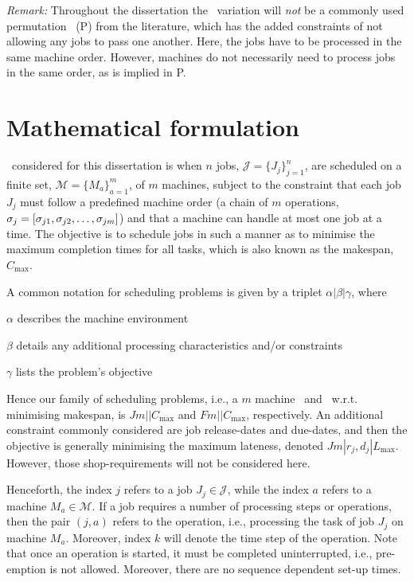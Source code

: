 \emph{Remark:} Throughout the dissertation the \FSP\ variation will \emph{not} 
be a commonly used permutation \fsp\ (P\FSP) from the literature, which has 
the added constraints of not allowing any jobs to pass one another.
Here, the jobs have to be processed in the same machine order. However, 
machines do not necessarily need to process jobs in the same order, as is 
implied in P\FSP.

\section{Mathematical formulation}
\Jsp\ considered for this dissertation is when $n$ jobs, 
$\mathcal{J}=\{J_j\}_{j=1}^n$, are scheduled on a finite set, 
$\mathcal{M}=\{M_a\}_{a=1}^m$, of $m$ machines, subject to the constraint that 
each job $J_j$ must follow a predefined machine order (a chain of 
$m$ operations, ${\mathbf{\sigma}}_j=[\sigma_{j1},\sigma_{j2},\dotsc,\sigma_{jm}]$) and 
that a machine can handle at most one job at a time. 
The objective is to schedule jobs in such a manner as to minimise the maximum 
completion times for all tasks, which is also known as the makespan, 
$C_{\max}$. 

A common notation for scheduling problems \citep[cf. Chapter 2 in ][]{Pinedo08} 
is given by a triplet $\alpha|\beta|\gamma$, where 
\begin{enumerate*}[itemjoin*={, and finally}, label={{}}]
    \item $\alpha$ describes the machine environment
    \item $\beta$ details any additional processing characteristics and/or 
    constraints
    \item $\gamma$ lists the problem's objective
\end{enumerate*}
Hence our family of scheduling problems, i.e., a $m$ machine \JSP\ and \FSP\ 
w.r.t. minimising makespan, is $Jm||C_{\max}$ and $Fm||C_{\max}$, respectively. 
An additional constraint commonly considered are job release-dates and 
due-dates, and then the objective is generally minimising the maximum lateness, 
denoted $Jm|r_j,d_j|L_{\max}$. 
However, those shop-requirements will not be considered here. 

Henceforth, the index $j$ refers to a job $J_j\in\mathcal{J}$, while the index 
$a$ refers to a machine $M_a\in\mathcal{M}$. If a job requires a number of 
processing steps or operations, then the pair $(j,a)$ refers to the operation, 
i.e., processing the task of job $J_j$ on machine $M_a$. Moreover, index $k$ 
will denote the time step of the operation. Note that once an operation is 
started, it must be completed uninterrupted, i.e., pre-emption is not allowed. 
Moreover, there are no sequence dependent set-up times.

